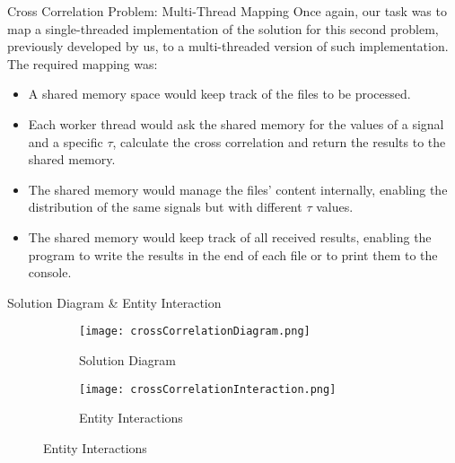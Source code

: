 \documentclass{beamer}
\begin{document}


\begin{frame}{Cross Correlation Problem: Multi-Thread Mapping}
	Once again, our task was to map a single-threaded implementation of the solution for this second problem, previously developed by us, to a multi-threaded
	version of such implementation.
	The required mapping was:
	\begin{itemize}
		\item A shared memory space would keep track of the files to be processed.
		\item Each worker thread would ask the shared memory for the values of a signal and a specific $\tau$, calculate the cross correlation and return the results to the shared memory.
		\item The shared memory would manage the files' content internally, enabling the distribution of the same signals but with different $\tau$ values.
		\item The shared memory would keep track of all received results, enabling the program to write the results in the end of each file or to print them to the console.
	\end{itemize}
\end{frame}


\begin{frame}{Solution Diagram \& Entity Interaction}
	\begin{figure}
		\begin{subfigure}{.49\textwidth}
			\hspace*{-.3in}
			\texttt{[image: crossCorrelationDiagram.png]}
			\caption{Solution Diagram}
			\label{crossDiagram}
		\end{subfigure}	
		\begin{subfigure}{.49\textwidth}
			\texttt{[image: crossCorrelationInteraction.png]}
			\caption{Entity Interactions}
			\label{crossInteraction}
		\end{subfigure}
	\end{figure}
\end{frame}
\end{document}
